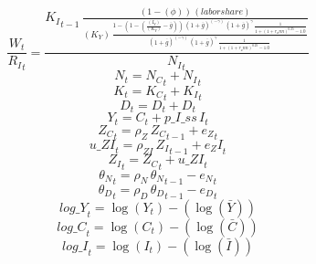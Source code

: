 \begin{dmath}
\frac{{{W}}_{t}}{{{R_I}}_{t}}=\frac{{{K_I}}_{t-1}\, \frac{\left(1-{(\phi)}\right)\, {(labor share)}}{{(K_Y)}\, \frac{1-\left(1-\left(\frac{{(I_Y)}}{{(K_Y)}}-{{\overline{g}}}\right)\right)\, \left(1+{{\overline{g}}}\right)^{\left(-{{\gamma}}\right)}\, \left(1+{{\overline{g}}}\right)^{{{\gamma}}}\, \frac{1}{1+\left(1+{{r_ann}}\right)^{0.25}-1.0}}{\left(1+{{\overline{g}}}\right)^{\left(-{{\gamma}}\right)}\, \left(1+{{\overline{g}}}\right)^{{{\gamma}}}\, \frac{1}{1+\left(1+{{r_ann}}\right)^{0.25}-1.0}}}}{{{N_I}}_{t}}
\end{dmath}
\begin{dmath}
{{N}}_{t}={{N_C}}_{t}+{{N_I}}_{t}
\end{dmath}
\begin{dmath}
{{K}}_{t}={{K_C}}_{t}+{{K_I}}_{t}
\end{dmath}
\begin{dmath}
{{D}}_{t}={{D}}_{t}+{{D}}_{t}
\end{dmath}
\begin{dmath}
{{Y}}_{t}={{C}}_{t}+{p\_I\_ss}\, {{I}}_{t}
\end{dmath}
\begin{dmath}
{{Z_C}}_{t}={{\rho_Z}}\, {{Z_C}}_{t-1}+{{e_Z}}_{t}
\end{dmath}
\begin{dmath}
{u\_ZI}_{t}={{\rho_{ZI}}}\, {{Z_I}}_{t-1}+{{e_ZI}}_{t}
\end{dmath}
\begin{dmath}
{{Z_I}}_{t}={{Z_C}}_{t}+{u\_ZI}_{t}
\end{dmath}
\begin{dmath}
{{\theta_N}}_{t}={{\rho_N}}\, {{\theta_N}}_{t-1}-{{e_N}}_{t}
\end{dmath}
\begin{dmath}
{{\theta_D}}_{t}={{\rho_D}}\, {{\theta_D}}_{t-1}-{{e_D}}_{t}
\end{dmath}
\begin{dmath}
{log\_Y}_{t}=\log\left({{Y}}_{t}\right)-(\log\left(\bar{{Y}}\right))
\end{dmath}
\begin{dmath}
{log\_C}_{t}=\log\left({{C}}_{t}\right)-(\log\left(\bar{{C}}\right))
\end{dmath}
\begin{dmath}
{log\_I}_{t}=\log\left({{I}}_{t}\right)-(\log\left(\bar{{I}}\right))
\end{dmath}

